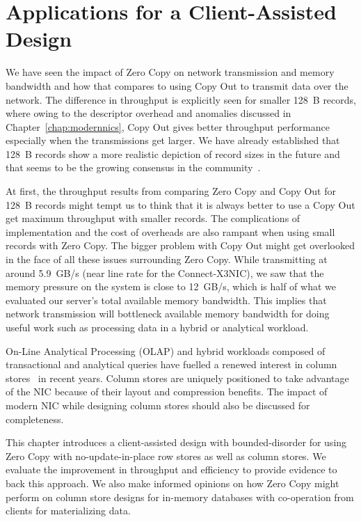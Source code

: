
\chapter{Applications for a Client-Assisted Design}
\label{chap:applications}

We have seen the impact of Zero Copy on network transmission and memory bandwidth and how that 
compares to using Copy Out to transmit data over the network. The difference
in throughput is explicitly seen for smaller 128~B records, where owing to the descriptor overhead and anomalies discussed 
in Chapter~\ref{chap:modernnics}, Copy Out gives better throughput performance especially when the transmissions get larger.
We have already established that 128~B records show a more realistic depiction of record sizes in the future
and that seems to be the growing consensus in the community~\cite{fb-memcache,fb-workload}. 

At first, the throughput results from comparing Zero Copy and Copy Out for 128~B 
records might tempt us to think that it is always better to use a Copy Out get maximum throughput with smaller records.
The complications of implementation and the cost of overheads are also rampant when using small records with Zero Copy.
The bigger problem with Copy Out might get overlooked in the face of all these issues surrounding Zero Copy.
While transmitting at around 5.9~GB/s (near line rate for the Connect-X3\textregistered NIC),
we saw that the memory pressure on the system is close to 12~GB/s, which is half of what we evaluated our server's total available memory bandwidth. 
This implies that network transmission will bottleneck available memory bandwidth for doing useful work such as processing data in a hybrid or analytical workload.

On-Line Analytical Processing (OLAP) and hybrid workloads composed of transactional and analytical queries have fuelled a renewed interest in column stores~\cite{cstore,cstorevsrowstore} in recent years. 
Column stores are uniquely positioned to take advantage of the NIC because of their layout and compression benefits.
 The impact of modern NIC while designing column stores should also be discussed for completeness. 

This chapter introduces a client-assisted design with bounded-disorder for using Zero Copy with no-update-in-place row stores as well as column stores. 
We evaluate the improvement in throughput and efficiency to provide evidence to back this approach.
We also make informed opinions on how Zero Copy might perform on column store designs 
for in-memory databases with co-operation from clients for materializing data.


